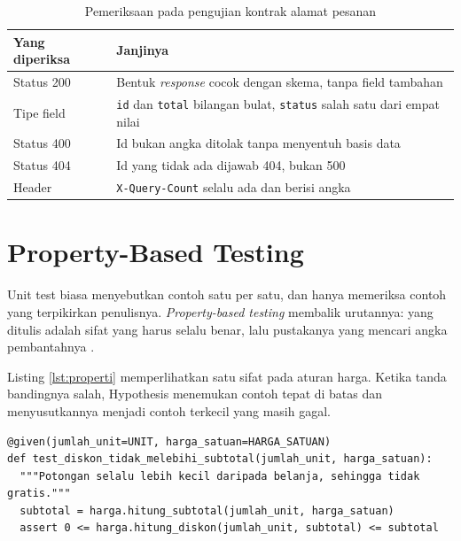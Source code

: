 \begin{table}[!htb]
  \centering
  \caption{Pemeriksaan pada pengujian kontrak alamat pesanan}
  \label{tab:kontrak}
  \begin{tabularx}{\textwidth}{lX}
    \hline
    \textbf{Yang diperiksa} & \textbf{Janjinya} \\
    \hline
    Status 200 & Bentuk \textit{response} cocok dengan skema, tanpa field tambahan \\
    \hline
    Tipe field & \texttt{id} dan \texttt{total} bilangan bulat, \texttt{status} salah satu dari empat nilai \\
    \hline
    Status 400 & Id bukan angka ditolak tanpa menyentuh basis data \\
    \hline
    Status 404 & Id yang tidak ada dijawab 404, bukan 500 \\
    \hline
    Header & \texttt{X-Query-Count} selalu ada dan berisi angka \\
    \hline
  \end{tabularx}
\end{table}

\section{Property-Based Testing}

Unit test biasa menyebutkan contoh satu per satu, dan hanya memeriksa contoh
yang terpikirkan penulisnya. \textit{Property-based testing} membalik
urutannya: yang ditulis adalah sifat yang harus selalu benar, lalu pustakanya
yang mencari angka pembantahnya \cite{hypothesis-docs}.

Listing \ref{lst:properti} memperlihatkan satu sifat pada aturan harga.
Ketika tanda bandingnya salah, Hypothesis menemukan contoh tepat di batas dan
menyusutkannya menjadi contoh terkecil yang masih gagal.

\begin{lstlisting}[style=PythonStyle, caption={Sifat yang harus selalu benar, bukan contoh satu per satu, tersedia di \berkas{sources/chapter06/test\_properti.py}}, label={lst:properti}]
@given(jumlah_unit=UNIT, harga_satuan=HARGA_SATUAN)
def test_diskon_tidak_melebihi_subtotal(jumlah_unit, harga_satuan):
  """Potongan selalu lebih kecil daripada belanja, sehingga tidak gratis."""
  subtotal = harga.hitung_subtotal(jumlah_unit, harga_satuan)
  assert 0 <= harga.hitung_diskon(jumlah_unit, subtotal) <= subtotal
\end{lstlisting}

